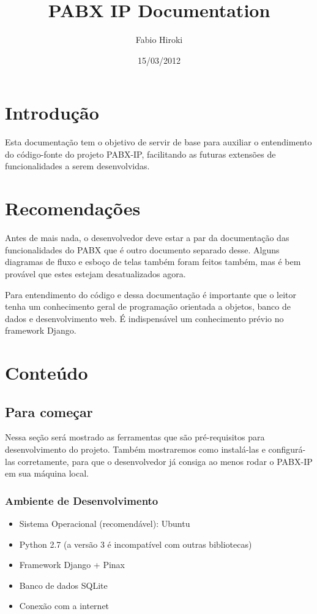 \documentclass[letterpaper,10pt,brazil]{sphinxmanual}
\title{PABX IP Documentation}
\date{15/03/2012}
\author{Fabio Hiroki}
\begin{document}
\maketitle
\tableofcontents
{}\label{index::doc}



\chapter{Introdução}
\label{index:bem-vindo-a-documentacao-do-projeto-pabx-ip}\label{index:introducao}
Esta documentação tem o objetivo de servir de base para auxiliar o entendimento do código-fonte do projeto PABX-IP, facilitando as futuras extensões de funcionalidades a serem desenvolvidas.


\chapter{Recomendações}
\label{index:recomendacoes}
Antes de mais nada, o desenvolvedor deve estar a par da documentação das funcionalidades do PABX que é outro documento separado desse. Alguns diagramas de fluxo e esboço de telas também foram feitos também, mas é bem provável que estes estejam desatualizados agora.

Para entendimento do código e dessa documentação é importante que o leitor tenha um conhecimento geral de programação orientada a objetos, banco de dados e desenvolvimento web. É indispensável um conhecimento prévio no framework Django.


\chapter{Conteúdo}
\label{index:conteudo}

\section{Para começar}
\label{inicio::doc}\label{inicio:para-comecar}
Nessa seção será mostrado as ferramentas que são pré-requisitos para desenvolvimento do projeto. Também mostraremos como instalá-las e configurá-las corretamente, para que o desenvolvedor já consiga ao menos rodar o PABX-IP em sua máquina local.


\subsection{Ambiente de Desenvolvimento}
\label{inicio:ambiente-de-desenvolvimento}\begin{itemize}
\item {} 
Sistema Operacional (recomendável): Ubuntu

\item {} 
Python 2.7 (a versão 3 é incompatível com outras bibliotecas)

\item {} 
Framework Django + Pinax

\item {} 
Banco de dados SQLite

\item {} 
Conexão com a internet

\end{itemize}
\end{document}
